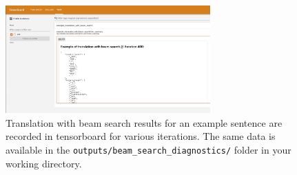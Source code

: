\begin{parts}
    \begin{figure}
        \centering
        \includegraphics[width=0.7\textwidth]{images/example_translation_beam.jpg}
        \caption{Translation with beam search results for an example sentence are recorded in tensorboard for various iterations. The same data is available in the \texttt{outputs/beam\_search\_diagnostics/} folder in your working directory.}
        \label{fig:beam-search-diagnostics-tensorboard}
    \end{figure}
    

\end{parts}
